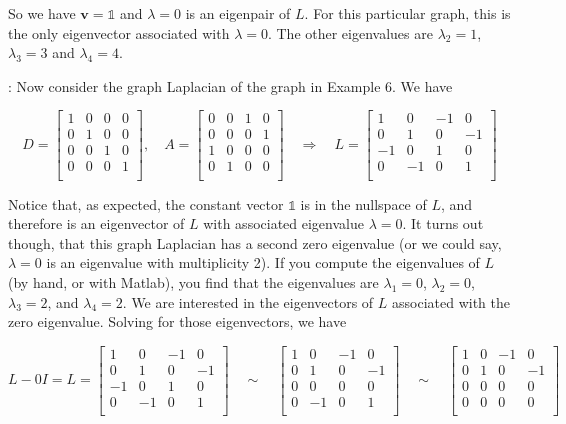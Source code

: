 \documentclass[12pt]{article}
\newcommand{\nin}{\noindent}
\newcommand{\vthree}{\vspace{3mm}}
\newcommand{\mymat}[1]{
\left[
\begin{array}{rrrrrrrrrrrrrrrrrrrrrrrrrrrrrrrrrrrrrrr}
#1
\end{array}
\right]
}
\newcommand{\bv}{\mathbf{v}}
\begin{document}
\vthree

\nin  So we have $\bv = \mathds{1}$ and $\lambda = 0$ is an eigenpair of $L$.  For this particular graph, this is the only eigenvector associated with $\lambda = 0$.  The other eigenvalues are $\lambda_2 = 1$, $\lambda_3 = 3$ and $\lambda_4 = 4$.

\vthree

\nin {\bf Example 8}:  Now consider the graph Laplacian of the graph in Example 6.  We have

\[
D =
\mymat{
1 & 0 & 0 & 0 \\
0 & 1 & 0 & 0 \\
0 & 0 & 1 & 0 \\
0 & 0 & 0 & 1 \\
},
\quad
A =
\mymat{
0 & 0 & 1 & 0 \\
0 & 0 & 0 & 1 \\
1 & 0 & 0 & 0 \\
0 & 1 & 0 & 0 \\
} \quad \Rightarrow \quad
L =
\mymat{
1 & 0 &-1 & 0 \\
0 & 1 & 0 &-1 \\
-1 & 0 & 1 & 0 \\
0 & -1 & 0 & 1 \\
}
\]

\vthree

\nin Notice that, as expected, the constant vector $\mathds{1}$ is in the nullspace of $L$, and therefore is an eigenvector of $L$ with associated eigenvalue $\lambda = 0$.  It turns out though, that this graph Laplacian has a second zero eigenvalue (or we could say, $\lambda = 0$ is an eigenvalue with multiplicity 2).  If you compute the eigenvalues of $L$ (by hand, or with Matlab), you find that the eigenvalues are $\lambda_1 = 0$, $\lambda_2 = 0$, $\lambda_3 = 2$, and $\lambda_4 = 2$.  We are interested in the eigenvectors of $L$ associated with the zero eigenvalue.  Solving for those eigenvectors, we have

\[
L - 0I = L =
\mymat{
1 & 0 &-1 & 0 \\
0 & 1 & 0 &-1 \\
-1 & 0 & 1 & 0 \\
0 & -1 & 0 & 1 \\
}
\quad \sim \quad
\mymat{
1 & 0 &-1 & 0 \\
0 & 1 & 0 &-1 \\
0 & 0 & 0 & 0 \\
0 & -1 & 0 & 1 \\
}
\quad \sim \quad
\mymat{
1 & 0 &-1 & 0 \\
0 & 1 & 0 &-1 \\
0 & 0 & 0 & 0 \\
0 & 0 & 0 & 0 \\
}
\]
\end{document}
